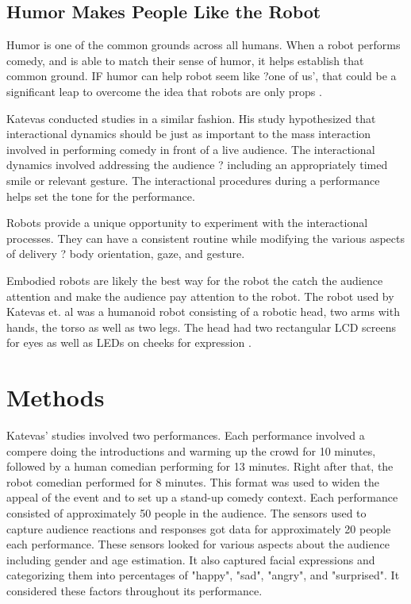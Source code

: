 \documentclass[onecolumn, draftclsnofoot,10pt, compsoc]{IEEEtran}
\begin{document}
\subsection{Humor Makes People Like the Robot }
Humor is one of the common grounds across all humans. When a robot performs comedy, and is able to match their sense of humor, it helps establish that common ground. IF humor can help robot seem like ?one of us', that could be a significant leap to overcome the idea that robots are only props \cite{KnightEightLessons:2011}.


Katevas conducted studies in a similar fashion. His study hypothesized that interactional dynamics should be just as important to the mass interaction involved in performing comedy in front of a live audience. The interactional dynamics involved addressing the audience ? including an appropriately timed smile or relevant gesture. The interactional procedures during a performance helps set the tone for the performance. 

Robots provide a unique opportunity to experiment with the interactional processes. They can have a consistent routine while modifying the various aspects of delivery ? body orientation, gaze, and gesture. 

Embodied robots are likely the best way for the robot the catch the audience attention and make the audience pay attention to the robot. The robot used by Katevas et. al was a humanoid robot consisting of a robotic head, two arms with hands, the torso as well as two legs. The head had two rectangular LCD screens for eyes as well as LEDs on cheeks for expression \cite{RobotComedyLab:2015}.	

\section{Methods}

Katevas' studies involved two performances. Each performance involved a compere doing the introductions and warming up the crowd for 10 minutes, followed by a human comedian performing for 13 minutes. Right after that, the robot comedian performed for 8 minutes. This format was used to widen the appeal of the event and to set up a stand-up comedy context. Each performance consisted of approximately 50 people in the audience. The sensors used to capture audience reactions and responses got data for approximately 20 people each performance. These sensors looked for various aspects about the audience including gender and age estimation. It also captured facial expressions and categorizing them into percentages of "happy", "sad", "angry", and "surprised". It considered these factors throughout its performance.
\end{document}
